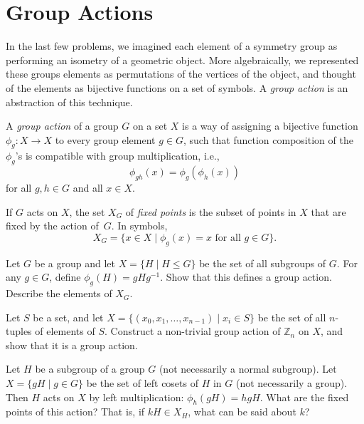 \section{Group Actions}

In the last few problems, we imagined each element of a symmetry group as performing an isometry of a geometric object. More algebraically, we represented these groups elements as permutations of the vertices of the object, and thought of the elements as bijective functions on a set of symbols. A \textit{group action} is an abstraction of this technique.

\begin{definition}
 A \emph{group action} of a group $G$ on a set $X$ is a way of assigning a bijective function $\phi_g : X \longrightarrow X$ to every group element $g \in G$, such that function composition of the $\phi_g$'s is compatible with group multiplication, i.e.,
 $$\phi_{gh}(x) = \phi_g(\phi_h(x))$$
 for all $g,h \in G$ and all $x\in X$.
\end{definition}

\begin{definition}
 If $G$ acts on $X$, the set $X_G$ of \emph{fixed points} is the subset of points in $X$ that are fixed by the action of~$G$. In symbols, $$X_G =\{ x \in X \mid \phi_g(x) = x \mbox{ for all } g \in G \}.$$
\end{definition}

\begin{problem}
Let $G$ be a group and let $X = \{ H \mid H \leq G\}$ be the set of all subgroups of $G$.  For any $g \in G$, define $\phi_g(H) = gHg^{-1}$.  Show that this defines a group action.  Describe the elements of $X_G$.
\end{problem}



\begin{problem}
Let $S$ be a set, and let $X = \{(x_0, x_1, \ldots, x_{n-1}) \mid x_i \in S \}$ be the set of all $n$-tuples of elements of $S$.  Construct a non-trivial group action of $\mathbb{Z}_n$ on $X$, and show that it is a group action.
\end{problem}



\begin{problem}
Let $H$ be a subgroup of a group $G$ (not necessarily a normal subgroup).  Let $X = \{gH \mid g\in G\}$ be the set of left cosets of $H$ in $G$ (not necessarily a group).  Then $H$ acts on $X$ by left multiplication: $\phi_h(gH) = hgH$.  What are the fixed points of this action?  That is, if $kH \in X_H$, what can be said about $k$?
\end{problem}



